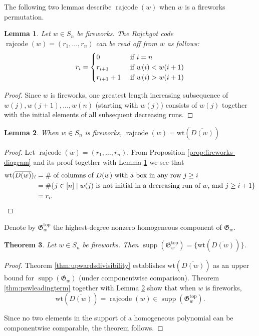 \documentclass{amsart}
\newtheorem{theorem}{Theorem}[section]
\newtheorem{lemma}[theorem]{Lemma}
\theoremstyle{definition}
\theoremstyle{named}
\DeclareMathOperator{\supp}{supp}
\DeclareMathOperator{\rajcode}{rajcode}
\begin{document}
	The following two lemmas describe $\rajcode(w)$ when $w$ is a fireworks permutation.
	\begin{lemma}
		\label{lem:rajcode-fireworks}
		Let $w \in S_n$ be fireworks. The Rajchgot code $\rajcode(w)=(r_1,\ldots,r_n)$ can be read off from $w$ as follows:
		\[
		r_i = 
		\begin{cases}
			0 &\textup{ if } i = n \\
			r_{i+1} &\textup{ if } w(i) < w(i+1)\\
			r_{i+1} + 1 &\textup{ if } w(i) > w(i+1)
		\end{cases}
		\]
	\end{lemma}
	\begin{proof}
		Since $w$ is fireworks, one greatest length increasing subsequence of $w(j),w(j+1),\ldots,w(n)$ (starting with $w(j)$) consists of $w(j)$ together with the initial elements of all subsequent decreasing runs.
	\end{proof}

	\begin{lemma}
		\label{lem:fireworks-raj-equals-closure}
		When $w\in S_n$ is fireworks, $\rajcode(w)=\mathrm{wt}(\overline{D(w)})$
	\end{lemma}
	\begin{proof}
		Let $\rajcode(w)=(r_1,\ldots,r_n)$. From Proposition \ref{prop:fireworks-diagram} and its proof together with Lemma \ref{lem:rajcode-fireworks} we see that
		\begin{align*}
			\mathrm{wt}(\overline{D(w)})_i &= \# \mbox{ of columns of $D(w)$ with a box in any row $j\geq i$}\\
			&=\#\{j\in [n] \mid w(j)\mbox{ is not initial in a decreasing run of $w$, and }j\geq i+1 \}\\
			&=r_i.\qedhere
		\end{align*}
	\end{proof}

	Denote by $\mathfrak G_w^\mathrm{top}$ the highest-degree nonzero homogeneous component of $\mathfrak G_w$. 	
	\begin{theorem}
		\label{thm:fireworks-support}
		Let $w\in S_n$ be fireworks. Then $\supp(\mathfrak G_w^\mathrm{top}) = \{\mathrm{wt}(\overline{D(w)}) \}$. 
	\end{theorem}
	\begin{proof}
		Theorem \ref{thm:upwardsdivisibility} establishes $\mathrm{wt}(\overline{D(w)})$ as an upper bound for $\supp(\mathfrak{G}_w)$ (under componentwise comparison). 
		Theorem \ref{thm:pswleadingterm} together with Lemma \ref{lem:fireworks-raj-equals-closure} show that when $w$ is fireworks, \[\mathrm{wt}(\overline{D(w)})=\rajcode(w) \in \supp(\mathfrak{G}_w^{\mathrm{top}}).\]
		
		Since no two elements in the support of a homogeneous polynomial can be componentwise comparable, the theorem follows.
	\end{proof}
\end{document}

